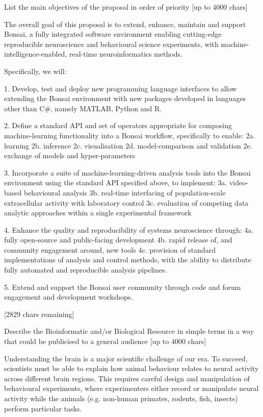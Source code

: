 
List the main objectives of the proposal in order of priority [up to
  4000 chars]

The overall goal of this proposal is to extend, enhance, maintain and support Bonsai, a fully integrated software environment enabling cutting-edge reproducible neuroscience and behavioural science experiments, with machine-intelligence-enabled, real-time neuroinformatics methods.

Specifically, we will:

1. Develop, test and deploy new programming language interfaces to allow extending the Bonsai environment with new packages developed in languages other than C#, namely MATLAB, Python and R.

2. Define a standard API and set of operators appropriate for composing machine-learning functionality into a Bonsai workflow, specifically to enable:
2a. learning
2b. inference
2c. visualisation
2d. model-comparison and validation
2e. exchange of models and hyper-parameters

3. Incorporate a suite of machine-learning-driven analysis tools into the Bonsai environment using the standard API specified above, to implement:
3a. video-based behavioural analysis
3b. real-time interfacing of population-scale extracellular activity with laboratory control  
3c. evaluation of competing data analytic approaches within a single experimental framework

4. Enhance the quality and reproducibility of systems neuroscience through:
4a. fully open-source and public-facing development
4b. rapid release of, and community engagement around, new tools
4c. provision of standard implementations of analysis and control methods, with the ability to distribute fully automated and reproducible analysis pipelines.

5. Extend and support the Bonsai user community through code and forum engagement and development workshops.

[2829 chars remaining]




Describe the Bioinformatic and/or Biological Resource in simple terms in a way that could be publicised to a general audience [up to 4000 chars]

Understanding the brain is a major scientific challenge of our era. To succeed, scientists must be able to explain how animal behaviour relates to neural activity across different brain regions. This requires careful design and manipulation of behavioural experiments, where experimenters either record or manipulate neural activity while the animals (e.g. non-human primates, rodents, fish, insects) perform particular tasks. 


